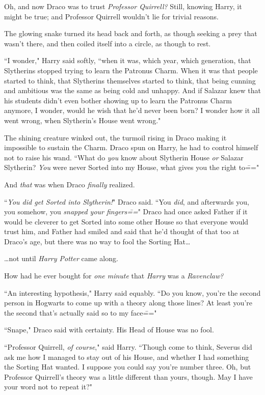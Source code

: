 Oh, and now Draco was to trust \emph{Professor Quirrell?} Still, knowing Harry, it might be true; and Professor Quirrell wouldn't lie for trivial reasons.

The glowing snake turned its head back and forth, as though seeking a prey that wasn't there, and then coiled itself into a circle, as though to rest.

``I wonder," Harry said softly, ``when it was, which year, which generation, that Slytherins stopped trying to learn the Patronus Charm. When it was that people started to think, that Slytherins themselves started to think, that being cunning and ambitious was the same as being cold and unhappy. And if Salazar knew that his students didn't even bother showing up to learn the Patronus Charm anymore, I wonder, would he wish that he'd never been born? I wonder how it all went wrong, when Slytherin's House went wrong."

The shining creature winked out, the turmoil rising in Draco making it impossible to sustain the Charm. Draco spun on Harry, he had to control himself not to raise his wand. ``What do \emph{you} know about Slytherin House \emph{or} Salazar Slytherin? \emph{You} were never Sorted into my House, what gives you the right to\==="

And \emph{that} was when Draco \emph{finally} realized.

``\emph{You did get Sorted into Slytherin!}" Draco said. ``You \emph{did}, and afterwards you, you somehow, you \emph{snapped your fingers\===}" Draco had once asked Father if it would be cleverer to get Sorted into some other House so that everyone would trust him, and Father had smiled and said that he'd thought of that too at Draco's age, but there was no way to fool the Sorting Hat{\ldots}

{\ldots}not until \emph{Harry Potter} came along.

How had he ever bought for \emph{one minute} that \emph{Harry} was a \emph{Ravenclaw?}

``An interesting hypothesis," Harry said equably. ``Do you know, you're the second person in Hogwarts to come up with a theory along those lines? At least you're the second that's actually said so to my face\==="

``Snape," Draco said with certainty. His Head of House was no fool.

``Professor Quirrell, \emph{of course}," said Harry. ``Though come to think, Severus did ask me how I managed to stay out of his House, and whether I had something the Sorting Hat wanted. I suppose you could say you're number three. Oh, but Professor Quirrell's theory was a little different than yours, though. May I have your word not to repeat it?"

